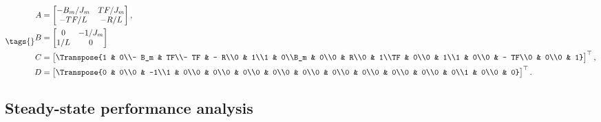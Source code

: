 \documentclass[dynamic_systems.tex]{subfiles}
\begin{document}
\begin{subequations}
\tags{}
\begin{align}
	A &= \begin{bmatrix}-B_m/J_m & TF/J_m\\ -TF/L & - R/L\end{bmatrix},\\
	B &= \begin{bmatrix}0 & -1/J_m\\ 1/L & 0 \end{bmatrix} \\
	C &= \begin{bmatrix}\Transpose{1 & 0\\- B_m & TF\\- TF & - R\\0 & 1\\1 & 0\\B_m & 0\\0 & R\\0 & 1\\TF & 0\\0 & 1\\1 & 0\\0 & - TF\\0 & 0\\0 & 1}\end{bmatrix}^\top, \\
	D &= \begin{bmatrix}\Transpose{0 & 0\\0 & -1\\1 & 0\\0 & 0\\0 & 0\\0 & 0\\0 & 0\\0 & 0\\0 & 0\\0 & 0\\0 & 0\\0 & 0\\1 & 0\\0 & 0}\end{bmatrix}^\top.
\end{align}
\end{subequations}

\subsection{Steady-state performance analysis}
\tags{}
\label{sec:steady_state_test_system}


\end{document}

